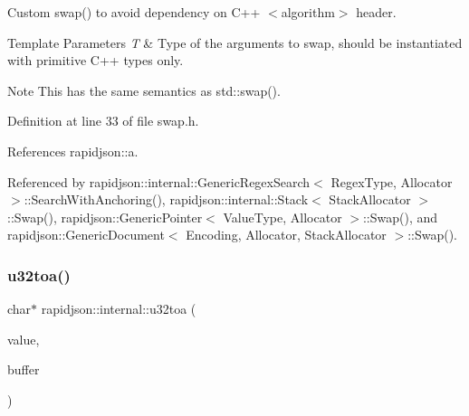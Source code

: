 Custom swap() to avoid dependency on C++ $<$algorithm$>$ header. 


\begin{DoxyTemplParams}{Template Parameters}
{\em T} & Type of the arguments to swap, should be instantiated with primitive C++ types only. \\
\hline
\end{DoxyTemplParams}
\begin{DoxyNote}{Note}
This has the same semantics as std\+::swap(). 
\end{DoxyNote}


Definition at line 33 of file swap.\+h.


\begin{DoxyCode}{0}

\end{DoxyCode}


References rapidjson\+::a.



Referenced by rapidjson\+::internal\+::\+Generic\+Regex\+Search$<$ Regex\+Type, Allocator $>$\+::\+Search\+With\+Anchoring(), rapidjson\+::internal\+::\+Stack$<$ Stack\+Allocator $>$\+::\+Swap(), rapidjson\+::\+Generic\+Pointer$<$ Value\+Type, Allocator $>$\+::\+Swap(), and rapidjson\+::\+Generic\+Document$<$ Encoding, Allocator, Stack\+Allocator $>$\+::\+Swap().

\mbox{\label{namespacerapidjson_1_1internal_ad5e42102d2ac70a691b3fdfdd2238e70}} 
\subsubsection{\texorpdfstring{u32toa()}{u32toa()}}
{\footnotesize\ttfamily char$\ast$ rapidjson\+::internal\+::u32toa (\begin{DoxyParamCaption}\item[{\mbox{\hyperlink{stdint_8h_a435d1572bf3f880d55459d9805097f62}{uint32\+\_\+t}}}]{value,  }\item[{char $\ast$}]{buffer }\end{DoxyParamCaption})}



